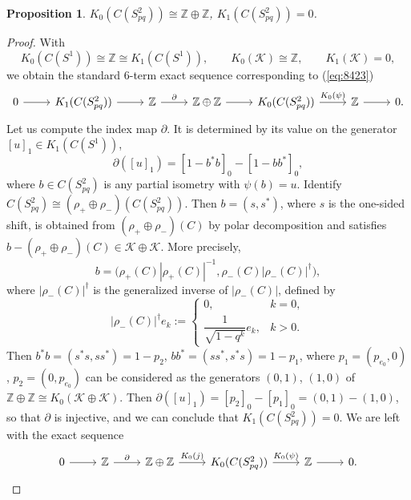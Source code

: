 \documentclass{book}
\newtheorem{proposition}[definition]{Proposition}
\begin{document}
\begin{proposition}
  \(K_0(C(S^2_{pq}))\cong\mathbb{Z}\oplus\mathbb{Z}\), \(K_1(C(S^2_{pq}))=0\).
\end{proposition}
\begin{proof}
  With
  \[
    K_0(C(S^1))\cong\mathbb Z\cong K_1(C(S^1)),
    \qquad
    K_0(\mathcal K)\cong\mathbb Z,
    \qquad
    K_1(\mathcal K)=0,
  \]
  we obtain the standard 6-term exact sequence corresponding to (\ref{eq:8423})
  \begin{equation}\label{eq:8424}
    \begin{tikzcd}
      0\arrow[r]&K_1(C(S^2_{pq}))\arrow[r]&\mathbb{Z}\arrow[r,"\partial"]&\mathbb{Z}\oplus\mathbb{Z}\arrow[r]&K_0(C(S^2_{pq}))\arrow[r,"K_0(\psi)"]&\mathbb{Z}\arrow[r]&0.
    \end{tikzcd}
  \end{equation}
  Let us compute the index map \(\partial\). It is determined by its value on the generator \({[u]}_1\in K_1(C(S^1))\),
  \begin{equation}
    \partial({[u]}_1)={[1-b^* b]}_0-{[1-b b^*]}_0,
  \end{equation}
  where \(b\in C(S^2_{pq})\) is any partial isometry with \(\psi(b)=u\). Identify \(C(S^2_{pq})\cong (\rho_+\oplus \rho_-)(C(S^2_{pq}))\).
  Then \(b=(s,s^*)\), where \(s\) is the one-sided shift, is obtained from
  \((\rho_+\oplus\rho_-)(C)\) by polar decomposition and satisfies
  \(b-(\rho_+\oplus\rho_-)(C)\in\mathcal{K}\oplus\mathcal{K}\). More precisely,
  \[
    b=
    \bigl(
      \rho_+(C)|\rho_+(C)|^{-1},
      \rho_-(C)|\rho_-(C)|^\dagger
    \bigr),
  \]
  where \(|\rho_-(C)|^\dagger\) is the generalized inverse of
  \(|\rho_-(C)|\), defined by
  \[
    |\rho_-(C)|^\dagger e_k:=\begin{cases}
      0,&k=0,\\[1mm]
      \dfrac{1}{\sqrt{1-q^k}}e_k,&k>0.
    \end{cases}
  \]
  Then \(b^* b=(s^* s,s s^*)=1-p_2\), \(b b^*=(s s^*,s^* s)=1-p_1\),
  where \(p_1=(p_{e_0},0)\), \(p_2=(0,p_{e_0})\) can be considered as the generators \((0,1)\), \((1,0)\)
  of \(\mathbb{Z}\oplus\mathbb{Z}\cong K_0(\mathcal{K}\oplus\mathcal{K})\). Then \(\partial({[u]}_1)={[p_2]}_0-{[p_1]}_0=(0,1)-(1,0)\),
  so that \(\partial\) is injective, and we can conclude that \(K_1(C(S^2_{pq}))=0\).
  We are left with the exact sequence
  \begin{equation}\label{eq:8426}
    \begin{tikzcd}
      0\arrow[r]&\mathbb{Z}\arrow[r,"\partial"]&\mathbb{Z}\oplus\mathbb{Z}\arrow[r,"K_0(j)"]&K_0(C(S^2_{pq}))\arrow[r,"K_0(\psi)"]&\mathbb{Z}\arrow[r]&0.

\end{tikzcd}
\end{equation}
\end{proof}
\end{document}
